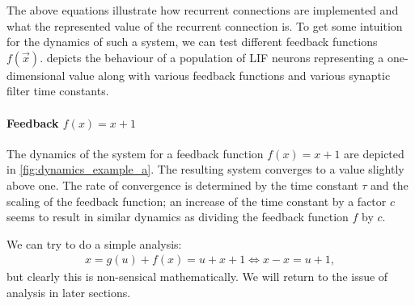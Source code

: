 \documentclass[10pt,letterpaper,oneside]{article}
\begin{document}
The above equations illustrate how recurrent connections are implemented and what the represented value of the recurrent connection is. To get some intuition for the dynamics of such a system, we can test different feedback functions $f(\vec x)$.  depicts the behaviour of a population of LIF neurons representing a one-dimensional value along with various feedback functions and various synaptic filter time constants.


\paragraph{Feedback $f(x) = x + 1$}
The dynamics of the system for a feedback function $f(x) = x + 1$ are depicted in \cref{fig:dynamics_example_a}. The resulting system converges to a value slightly above one. The rate of convergence is determined by the time constant $\tau$ and the scaling of the feedback function; an increase of the time constant by a factor $c$ seems to result in similar dynamics as dividing the feedback function $f$ by $c$.

We can try to do a simple analysis:
\begin{align*}
  x = g(u) + f(x) = u + x + 1 \Leftrightarrow x-x=u+1,
\end{align*}
but clearly this is non-sensical mathematically. We will return to the issue of analysis in later sections.
\end{document}
